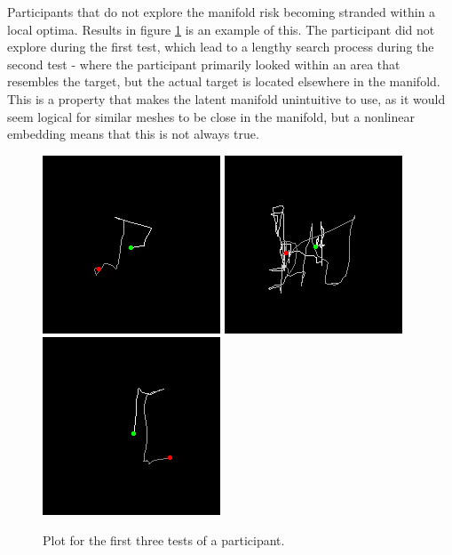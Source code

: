 \documentclass[ %
author={Dillon Keith Diep},
supervisor={Dr. Carl Henrik Ek},
degree={MEng},
title={ART-CG:},
subtitle={Assisted Real-time Content Generation of 3D Hair by Learning Manifolds},
type={Research},
year={2017} ]{dissertation}
\begin{document}
Participants that do not explore the manifold risk becoming stranded within a local optima. Results in figure \ref{mariaresult} is an example of this. The participant did not explore during the first test, which lead to a lengthy search process during the second test - where the participant primarily looked within an area that resembles the target, but the actual target is located elsewhere in the manifold. This is a property that makes the latent manifold unintuitive to use, as it would seem logical for similar meshes to be close in the manifold, but a nonlinear embedding means that this is not always true.

\begin{figure}[!h]
	\centering
	\caption{Plot for the first three tests of a participant.}
	\includegraphics[scale=0.6]{images/experiment/Maria_Marinova_ONE_REPLOT}
	\includegraphics[scale=0.6]{images/experiment/Maria_Marinova_TWO_REPLOT}
	\includegraphics[scale=0.6]{images/experiment/Maria_Marinova_THREE_REPLOT}
	\label{mariaresult}
\end{figure}
\end{document}
